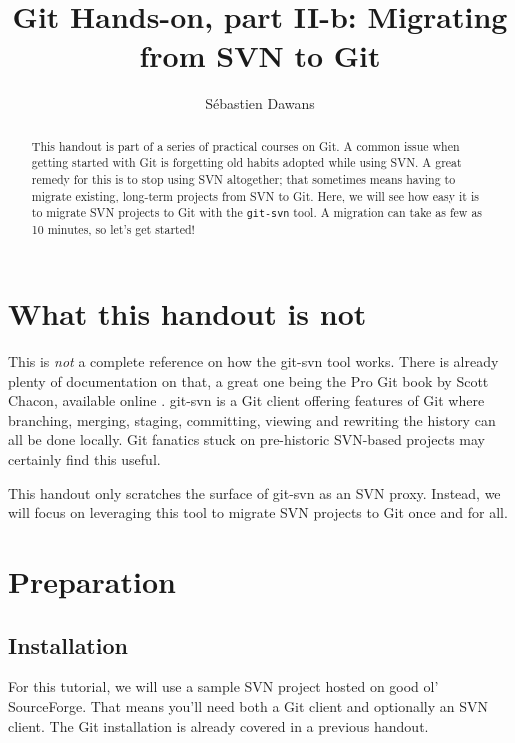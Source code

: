 \documentclass{../common/tufte-latex/tufte-handout}
\title{Git Hands-on, part II-b: Migrating from SVN to Git}
\author{S\'ebastien Dawans}
\begin{document}
\maketitle%

\begin{abstract}
\noindent
This handout is part of a series of practical courses on Git.
A common issue when getting started with Git is forgetting old habits adopted while using SVN.
A great remedy for this is to stop using SVN altogether; that sometimes means having to migrate existing, long-term projects from SVN to Git.
Here, we will see how easy it is to migrate SVN projects to Git with the \texttt{git-svn} tool.
A migration can take as few as 10 minutes, so let's get started!
\end{abstract}

\section{What this handout is not}

This is \textit{not} a complete reference on how the git-svn tool works.
There is already plenty of documentation on that, a great one being the Pro Git book by Scott Chacon, available online \cite{git-scm-ch8}.
git-svn is a Git client offering features of Git where branching, merging, staging, committing, viewing and rewriting the history can all be done locally.
Git fanatics stuck on pre-historic SVN-based projects may certainly find this useful.

This handout only scratches the surface of git-svn as an SVN proxy.
Instead, we will focus on leveraging this tool to migrate SVN projects to Git once and for all.

\section{Preparation}

\subsection{Installation}

For this tutorial, we will use a sample SVN project hosted on good ol' SourceForge. 
That means you'll need both a Git client and optionally an SVN client.
The Git installation is already covered in a previous handout.
\end{document}
